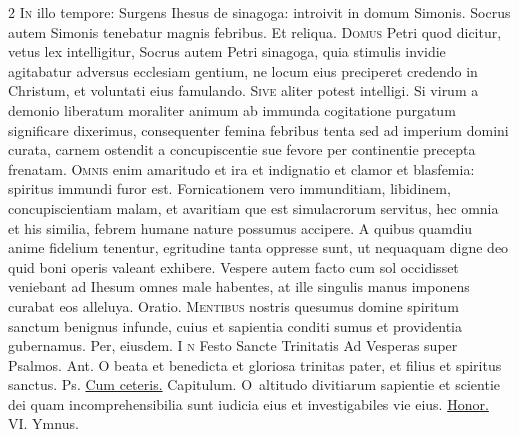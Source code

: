\begin{multicols*}{2}
\lettrine[lines=2]{\zallmancaps \color{Red} I}{n} illo tempore: Surgens Ihesus de sinagoga: introivit in domum Simonis. Socrus autem Simonis tenebatur magnis febribus. Et reliqua.
\lettrine[lines=2]{\zallmancaps \color{Blue} D}{omus} Petri quod dicitur, vetus lex intelligitur, Socrus autem Petri sinagoga, quia stimulis invidie agitabatur adversus ecclesiam gentium, ne locum eius preciperet credendo in Christum, et voluntati eius famulando.
\lettrine[lines=2]{\zallmancaps \color{Red} S}{ive} aliter potest intelligi. Si virum a demonio liberatum moraliter animum ab immunda cogitatione purgatum significare dixerimus, consequenter femina febribus tenta sed ad imperium domini curata, carnem ostendit a concupiscentie sue fevore per continentie precepta frenatam.
\lettrine[lines=2]{\zallmancaps \color{Blue} O}{mnis} enim amaritudo et ira et indignatio et clamor et blasfemia: spiritus immundi furor est. Fornicationem vero immunditiam, libidinem, concupiscientiam malam, et avaritiam que est simulacrorum servitus, hec omnia et his similia, febrem humane nature possumus accipere. A quibus quamdiu anime fidelium tenentur, egritudine tanta oppresse sunt, ut nequaquam digne deo quid boni operis valeant exhibere.
 Vespere autem facto cum sol occidisset veniebant ad Ihesum omnes male habentes, at ille singulis manus imponens curabat eos alleluya. {\color{Red} Oratio.}
\lettrine[lines=2]{\zallmancaps \color{Red} M}{entibus} nostris quesumus domine spiritum sanctum benignus infunde, cuius et sapientia conditi sumus et providentia gubernamus. Per, eiusdem.
{\color{Red} }
\lettrine[lines=2]{\zallmancaps \color{Blue} I}{\color{Red} n} {\color{Red} Festo Sancte Trinitatis Ad Vesperas super Psalmos. Ant.} O beata et benedicta et gloriosa trinitas pater, et filius et spiritus sanctus. {\color{Red} Ps.}  \ul{Cum ceteris.} {\color{Red} Capitulum.}
\lettrine[lines=2]{\zallmancaps \color{Red} O}{}\ altitudo divitiarum sapientie et scientie dei quam incomprehensibilia sunt iudicia eius et investigabiles vie eius. \R \hyperlink{honor-virtus}{Honor.} {\color{Red} VI. Ymnus.}
\end{multicols*}
